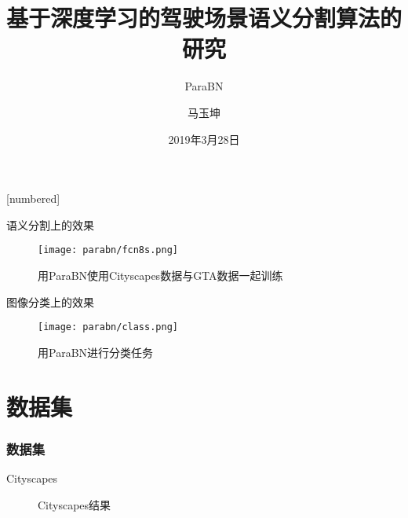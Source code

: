 \documentclass[hyperref={unicode=true}]{beamer}
\theoremstyle{definition}
\theoremstyle{proof}
\begin{document}
[numbered]
\renewcommand\figurename{图}
\renewcommand\tablename{表}
\renewcommand\contentsname{\centering 目录}


\title{基于深度学习的驾驶场景语义分割算法的研究}
\subtitle{ParaBN}
\author{马玉坤}
\date{2019年3月28日}

\begin{frame}\titlepage\end{frame}

  \begin{frame}\tableofcontents\end{frame}

    \begin{frame}{语义分割上的效果}
      \begin{figure}[!h]
        \centering
        \texttt{[image: parabn/fcn8s.png]}
        \caption{用ParaBN使用Cityscapes数据与GTA数据一起训练}
        \label{fig:parabn_fcn8s}
      \end{figure}
    \end{frame}

    \begin{frame}{图像分类上的效果}
      \begin{figure}[!h]
        \centering
        \texttt{[image: parabn/class.png]}
        \caption{用ParaBN进行分类任务}
        \label{fig:parabn_class}
      \end{figure}
    \end{frame}

\section{数据集}


\begin{frame}\frametitle{数据集}
  \begin{block}{Cityscapes}
    \begin{figure}[!h]
      \setlength{\subfigcapskip}{-1bp}
      \centering
      \begin{minipage}{\textwidth}
        \centering
        \hspace{2em}
      \end{minipage}
      \begin{minipage}{\textwidth}
        \centering
        \hspace{2em}
      \end{minipage}
      \caption{Cityscapes结果}\label{fig:cs_samples}
    \end{figure}
  \end{block}
\end{frame}
\end{document}

